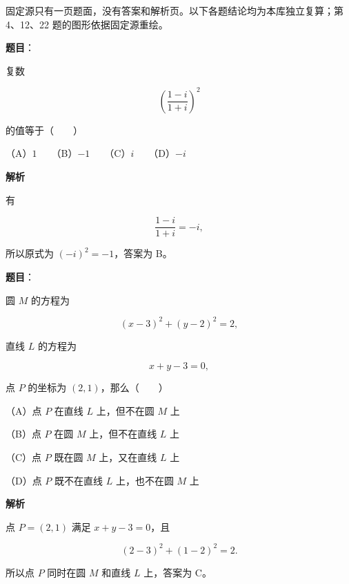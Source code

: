 

\begin{gktip}
固定源只有一页题面，没有答案和解析页。以下各题结论均为本库独立复算；第 4、12、22 题的图形依据固定源重绘。
\end{gktip}

\begin{answer}

\textbf{题目}：

复数

\nopagebreak[4]
\[
\left(\frac{1-i}{1+i}\right)^2
\]

的值等于\mbox{（　　）}

（A）$1$　　（B）$-1$　　（C）$i$　　（D）$-i$

\textbf{解析}

有

\nopagebreak[4]
\[
\frac{1-i}{1+i}=-i,
\]

所以原式为 $(-i)^2=-1$，答案为 B。


\end{answer}
\begin{answer}

\textbf{题目}：

圆 $M$ 的方程为

\nopagebreak[4]
\[
(x-3)^2+(y-2)^2=2,
\]

直线 $L$ 的方程为

\nopagebreak[4]
\[
x+y-3=0,
\]

点 $P$ 的坐标为 $(2,1)$，那么\mbox{（　　）}

（A）点 $P$ 在直线 $L$ 上，但不在圆 $M$ 上

（B）点 $P$ 在圆 $M$ 上，但不在直线 $L$ 上

（C）点 $P$ 既在圆 $M$ 上，又在直线 $L$ 上

（D）点 $P$ 既不在直线 $L$ 上，也不在圆 $M$ 上

\textbf{解析}

点 $P=(2,1)$ 满足 $x+y-3=0$，且

\nopagebreak[4]
\[
(2-3)^2+(1-2)^2=2.
\]

所以点 $P$ 同时在圆 $M$ 和直线 $L$ 上，答案为 C。


\end{answer}
